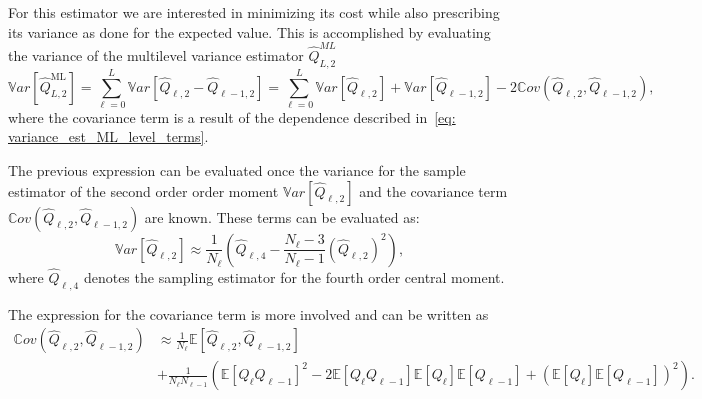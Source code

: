 For this estimator we are interested in minimizing its cost while also prescribing its variance as done for the expected value. This is accomplished by evaluating the 
variance of the multilevel variance estimator $\hat{Q}_{L,2}^{ML}$
\begin{equation}
 \mathbb{V}ar\left[ \hat{Q}_{L,2}^{\mathrm{ML}} \right] = \sum_{\ell=0}^L \mathbb{V}ar\left[ \hat{Q}_{\ell,2} - \hat{Q}_{\ell-1,2} \right]
                                               = \sum_{\ell=0}^L \mathbb{V}ar\left[ \hat{Q}_{\ell,2} \right] + \mathbb{V}ar\left[\hat{Q}_{\ell-1,2} \right]
                                               - 2 \mathbb{C}ov\left( \hat{Q}_{\ell,2},\hat{Q}_{\ell-1,2} \right),
\end{equation}
where the covariance term is a result of the dependence described in~\eqref{eq: variance_est_ML_level_terms}.

The previous expression can be evaluated once the variance for the sample estimator of the second order order moment $\mathbb{V}ar\left[ \hat{Q}_{\ell,2} \right]$ and the covariance term $\mathbb{C}ov\left( \hat{Q}_{\ell,2},\hat{Q}_{\ell-1,2} \right)$ are known. These terms can be evaluated as:
\begin{equation}
 \mathbb{V}ar\left[ \hat{Q}_{\ell,2} \right] \approx \frac{1}{N_\ell} \left( \hat{Q}_{\ell,4} - \frac{N_\ell-3}{N_\ell-1} \left(\hat{Q}_{\ell,2}\right)^2 \right),
\end{equation}
where $\hat{Q}_{\ell,4}$ denotes the sampling estimator for the fourth order central moment.

The expression for the covariance term is more involved and can be written as
\begin{equation}
\begin{split}
 \mathbb{C}ov\left( \hat{Q}_{\ell,2},\hat{Q}_{\ell-1,2} \right) &\approx \frac{1}{N_\ell} \mathbb{E}\left[ \hat{Q}_{\ell,2},\hat{Q}_{\ell-1,2} \right] \\
                                                                      &+ \frac{1}{N_\ell N_{\ell-1}} \left( \mathbb{E}\left[ Q_\ell Q_{\ell-1} \right]^2
                                                                      - 2  \mathbb{E}\left[ Q_\ell Q_{\ell-1} \right] \mathbb{E}\left[ Q_\ell \right] \mathbb{E}\left[Q_{\ell-1} \right] + \left( \mathbb{E}\left[ Q_\ell \right] \mathbb{E}\left[Q_{\ell-1} \right] \right)^2
                                                                      \right).
\end{split}
\end{equation}

